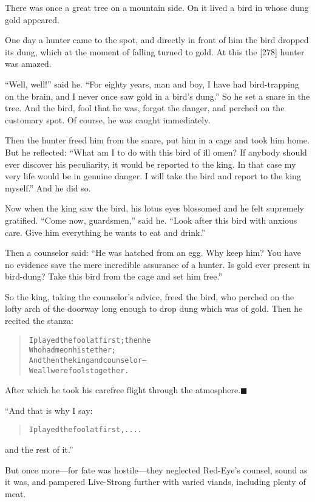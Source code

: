 \documentclass[article, twoside, 14pt]{memoir}
\newcommand{\qed}{\hfill \ensuremath{\blacksquare}}
\renewenvironment{verbatim}{%
\begin{quote}%
\vskip -10pt%
\begin{alltt}\normalfont\large}{\end{alltt}%
\end{quote}%
\vskip -10pt
} %
\begin{document}
\label{s61}

There was once a great tree on a mountain side. On it lived a bird
in whose dung gold appeared.

One day a hunter came to the spot, and directly in front of him the
bird dropped its dung, which at the moment of falling turned to
gold. At this the [278] hunter was amazed.

``Well, well!'' said he.
``For eighty years, man and boy, I have had bird-trapping on the brain, and I never once saw gold in a bird's dung.''
So he set a snare in the tree. And the bird, fool that he was,
forgot the danger, and perched on the customary spot. Of course, he
was caught immediately.

Then the hunter freed him from the snare, put him in a cage and
took him home. But he reflected:
``What am I to do with this bird of ill omen? If anybody should ever discover his peculiarity, it would be reported to the king. In that case my very life would be in genuine danger. I will take the bird and report to the king myself.''
And he did so.

Now when the king saw the bird, his lotus eyes blossomed and he
felt supremely gratified. ``Come now, guardsmen,'' said he.
``Look after this bird with anxious care. Give him everything he wants to eat and drink.''

Then a counselor said:
``He was hatched from an egg. Why keep him? You have no evidence save the mere incredible assurance of a hunter. Is gold ever present in bird-dung? Take this bird from the cage and set him free.''

So the king, taking the counselor's advice, freed the bird, who
perched on the lofty arch of the doorway long enough to drop dung
which was of gold. Then he recited the stanza:

\begin{verbatim}
I played the fool at first; then he
    Who had me on his tether;
And then the king and counselor--
    We all were fools together.
\end{verbatim}
After which he took his carefree flight through the
atmosphere.\hyperref[s61]{\qed}

“And that is why I say:

\begin{verbatim}
I played the fool at first, ....
\end{verbatim}
and the rest of it.”

But once more---for fate was hostile---they neglected Red-Eye's
counsel, sound as it was, and pampered Live-Strong further with
varied viands, including plenty of meat.
\end{document}

